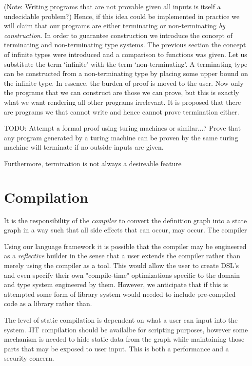 \documentclass[11pt]{article}
\begin{document}
(Note: Writing programs that are not provable given all inputs is itself a undecidable problem?)
Hence, if this idea could be implemented in practice we will claim that our programs are either terminating or non-terminating \emph{by construction}.
In order to guarantee construction we introduce the concept of terminating and non-terminating type systems.
The previous section the concept of infinite types were introduced and a comparison to functions was given.
Let us substitute the term `infinite' with the term `non-terminating'. A terminating type can be constructed from a non-terminating type by placing some upper bound on the infinite type.
In essence, the burden of proof is moved to the user.
Now only the programs that we can construct are those we can prove, but this is exactly what we want rendering all other programs irrelevant.
It is proposed that there are programs we that cannot write and hence cannot prove termination either.

TODO: Attempt a formal proof using turing machines or similar...? Prove that any program generated by a turing machine can be proven by the same turing machine will terminate if no outside inputs are given.


Furthermore, termination is not always a desireable feature

\section*{Compilation}
It is the responsibility of the \emph{compiler} to convert the definition graph into a state graph in a way such that all side effects that can occur, may occur. The compiler

Using our language framework it is possible that the compiler may be engineered as a \emph{reflective} builder in the sense that a user extends the compiler rather than merely using the compiler as a tool.
This would allow the user to create DSL's and even specify their own "compile-time" optimizations specific to the domain and type system engineered by them.
However, we anticipate that if this is attempted some form of library system would needed to include pre-compiled code as a library rather than.

The level of static compilation is dependent on what a user can input into the system. JIT compilation should be availalbe for scripting purposes, however some mechanism is needed to hide static data 
from the graph while maintaining those parts that may be exposed to user input.
This is both a performance and a security concern.
\end{document}
